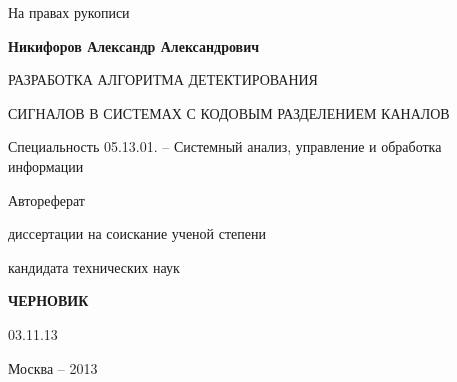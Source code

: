 \hfill На правах рукописи

\vspace{\baselineskip}
\vspace{\baselineskip}
\vspace{\baselineskip}
\vspace{\baselineskip}

\noindent\centerline{\bf{Никифоров Александр Александрович}}

\vspace{\baselineskip}
\vspace{\baselineskip}
\vspace{\baselineskip}
\vspace{\baselineskip}

\noindent\centerline{РАЗРАБОТКА АЛГОРИТМА ДЕТЕКТИРОВАНИЯ}
\noindent\centerline{СИГНАЛОВ В СИСТЕМАХ С КОДОВЫМ РАЗДЕЛЕНИЕМ КАНАЛОВ}

\vspace{\baselineskip}
\vspace{\baselineskip}
\vspace{\baselineskip}
\vspace{\baselineskip}

\noindent\centerline{Специальность 05.13.01. – Системный анализ, управление и обработка информации}

\vspace{\baselineskip}
\vspace{\baselineskip}
\vspace{\baselineskip}
\vspace{\baselineskip}

\noindent\centerline{Автореферат} 
\noindent\centerline{диссертации на соискание ученой степени}
\noindent\centerline{кандидата технических наук}


\vspace{\baselineskip}
\vspace{\baselineskip}
\vspace{\baselineskip}
\vspace{\baselineskip}
\noindent\centerline{\bf{ЧЕРНОВИК}}
\noindent\centerline{03.11.13}

\vfill
\noindent\centerline{Москва – 2013}

\newpage

\vspace{\baselineskip}
\vspace{\baselineskip}
\vspace{\baselineskip}
\vspace{\baselineskip}

